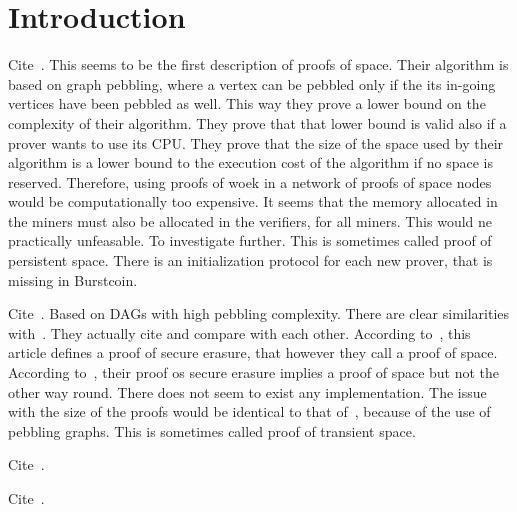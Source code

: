 \section{Introduction}\label{sec:introduction}

Cite~\cite{DziembowskiFKP15}. This seems to be the first description of proofs of space.
Their algorithm is based on graph pebbling, where a vertex can be pebbled only if the
its in-going vertices have been pebbled as well. This way they prove a lower bound on the
complexity of their algorithm. They prove that that lower bound is valid also if a prover
wants to use its CPU. They prove that the size of the space used by their algorithm
is a lower bound to the execution cost of the algorithm if no space is reserved.
Therefore, using proofs of woek in a network of proofs of space nodes would
be computationally too expensive. It seems that the memory allocated in the miners
must also be allocated in the verifiers, for all miners. This would ne practically unfeasable.
To investigate further.
This is sometimes called proof of persistent space.
There is an initialization protocol for each new prover, that is missing in Burstcoin.

Cite~\cite{AtenieseBFG14}. Based on DAGs with high pebbling complexity. There are clear similarities
with~\cite{DziembowskiFKP15}. They actually cite and compare with each other.
According to~\cite{DziembowskiFKP15}, this article defines a proof of secure erasure,
that however they call a proof of space. According to~\cite{DziembowskiFKP15},
their proof os secure erasure
implies a proof of space but not the other way round. There does not seem to exist
any implementation. The issue with the size of the proofs would be identical to that
of~\cite{DziembowskiFKP15}, because of the use of pebbling graphs.
This is sometimes called proof of transient space.

Cite~\cite{TangZDWLG0L19}.

Cite~\cite{RenD16}.

